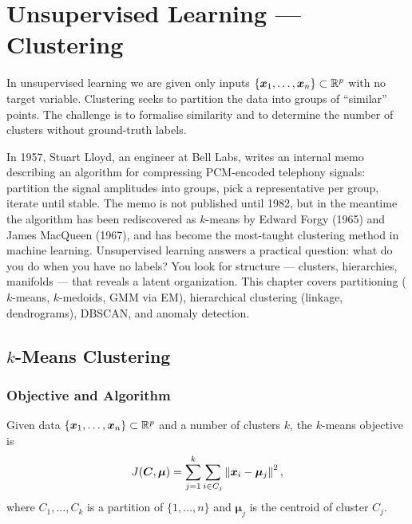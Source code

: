 \chapter{Unsupervised Learning --- Clustering}
\label{ch:unsupervised}

\begin{intuition}[title=\textbf{Learning Without Labels}]
In unsupervised learning we are given only inputs $\{\bm{x}_1,\dots,\bm{x}_n\}\subset\mathbb{R}^p$ with no target variable. Clustering seeks to partition the data into groups of ``similar'' points. The challenge is to formalise similarity and to determine the number of clusters without ground-truth labels.
\end{intuition}

In 1957, Stuart Lloyd, an engineer at Bell Labs, writes an internal memo describing an algorithm for compressing PCM-encoded telephony signals: partition the signal amplitudes into groups, pick a representative per group, iterate until stable. The memo is not published until 1982, but in the meantime the algorithm has been rediscovered as $k$-means by Edward Forgy (1965) and James MacQueen (1967), and has become the most-taught clustering method in machine learning. Unsupervised learning answers a practical question: what do you do when you have no labels? You look for structure --- clusters, hierarchies, manifolds --- that reveals a latent organization. This chapter covers partitioning ($k$-means, $k$-medoids, GMM via EM), hierarchical clustering (linkage, dendrograms), DBSCAN, and anomaly detection.

\section{\texorpdfstring{$k$}{k}-Means Clustering}

\subsection{Objective and Algorithm}

\begin{definition}
Given data $\{\bm{x}_1,\dots,\bm{x}_n\}\subset\mathbb{R}^p$ and a number of clusters $k$, the $k$-means objective is
\[
  J(\bm{C},\bm{\mu}) = \sum_{j=1}^k \sum_{i\in C_j} \left\| \bm{x}_i - \bm{\mu}_j \right\|^2,
\]
where $C_1,\dots,C_k$ is a partition of $\{1,\dots,n\}$ and $\bm{\mu}_j$ is the centroid of cluster $C_j$.
\end{definition}

